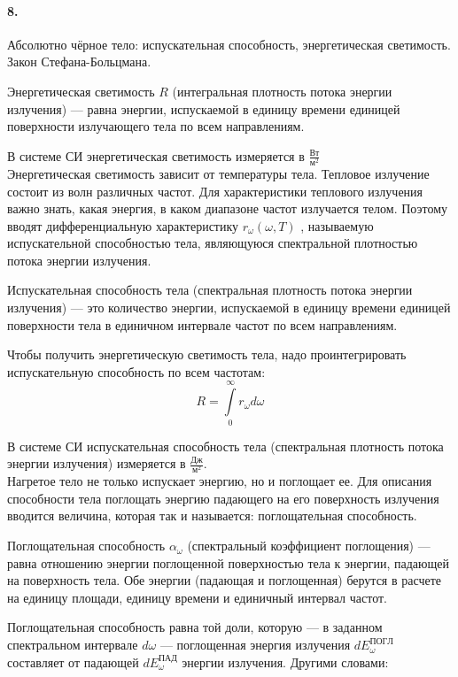 



	\paragraph{8.}
	Абсолютно чёрное тело: испускательная способность, энергетическая светимость. Закон Стефана-Больцмана.\\
	
	\begin{definition}
	Энергетическая светимость $R$ (интегральная плотность потока энергии излучения) — равна энергии, испускаемой в единицу времени единицей поверхности излучающего тела по всем направлениям.
	\end{definition}
	 
	
	В системе СИ энергетическая светимость измеряется в $\frac{Вт}{м^2}$\\
	
	Энергетическая светимость зависит от температуры тела. Тепловое излучение состоит из волн различных частот. Для характеристики теплового излучения важно знать, какая энергия, в каком диапазоне частот излучается телом. Поэтому вводят дифференциальную характеристику $r_ω(ω,T)$  , называемую испускательной способностью тела, являющуюся  спектральной плотностью потока энергии излучения.\\
	
	\begin{definition}
		Испускательная способность тела (спектральная плотность потока энергии излучения) — это количество энергии, испускаемой в единицу времени единицей поверхности тела в единичном интервале частот по всем направлениям.
	\end{definition}   
	Чтобы получить энергетическую светимость тела, надо проинтегрировать испускательную способность по всем частотам:
	$$R = \int\limits_{0}^{\infty} r_ω dω$$
	
	В системе СИ испускательная способность тела (спектральная плотность потока энергии излучения) измеряется в $\frac{Дж}{м^2}$.\\
	
	Нагретое тело не только испускает энергию, но и поглощает ее. Для описания способности тела поглощать энергию падающего на его поверхность излучения вводится величина, которая так и называется: поглощательная способность.\\
	\begin{definition}
		Поглощательная способность $α_ω$  (спектральный коэффициент поглощения) — равна отношению энергии поглощенной поверхностью тела к энергии, падающей на поверхность тела. Обе энергии (падающая и поглощенная) берутся в расчете на единицу площади, единицу времени и единичный интервал частот.
	\end{definition}
	Поглощательная способность равна той доли, которую — в заданном спектральном интервале $dω$  — поглощенная энергия излучения $dE_ω^{ПОГЛ}$  составляет от падающей $dE_ω^{ПАД}$ энергии излучения. Другими словами:
	
